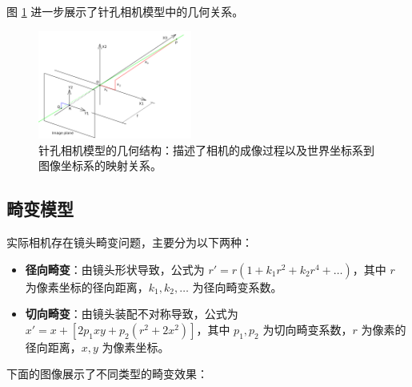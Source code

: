 \documentclass[hyperref,a4paper,UTF8]{ctexart}
\begin{document}
图 \ref{fig:pinhole_geometry} 进一步展示了针孔相机模型中的几何关系。

\begin{figure}[h]
    \centering
    \includegraphics[width=0.45\textwidth]{assets/pinhole_geometry.png}
    \caption{针孔相机模型的几何结构：描述了相机的成像过程以及世界坐标系到图像坐标系的映射关系。}
    \label{fig:pinhole_geometry}
\end{figure}

\subsection{畸变模型}

实际相机存在镜头畸变问题，主要分为以下两种：

\begin{itemize}
    \item \textbf{径向畸变}：由镜头形状导致，公式为 $r' = r(1 + k_1r^2 + k_2r^4 + \dots)$，其中 $r$ 为像素坐标的径向距离，$k_1, k_2, \dots$ 为径向畸变系数。
    \item \textbf{切向畸变}：由镜头装配不对称导致，公式为 $x' = x + [2p_1xy + p_2(r^2 + 2x^2)]$，其中 $p_1, p_2$ 为切向畸变系数，$r$ 为像素的径向距离，$x, y$ 为像素坐标。
\end{itemize}

下面的图像展示了不同类型的畸变效果：
\end{document}

